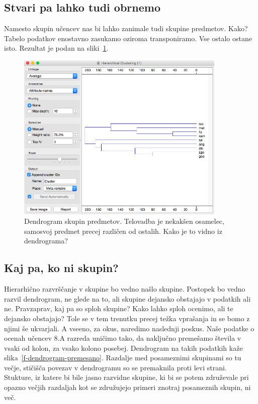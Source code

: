 \subsection{Stvari pa lahko tudi obrnemo}

Namesto skupin učencev nas bi lahko zanimale tudi skupine
predmetov. Kako? Tabelo podatkov enostavno zasukamo oziroma
transponiramo. Vse ostalo ostane isto. Rezultat je podan na
sliki~\ref{f-dendrogram-predmeti}.

\begin{figure}[htbp]
\begin{center}
\includegraphics[width=10cm]{slike/dendrogram-predmeti.png}
\caption{Dendrogram skupin predmetov. Telovadba je nekakšen osamelec,
  samosvoj predmet precej različen od ostalih. Kako je to vidno iz
  dendrograma?}
\label{f-dendrogram-predmeti}
\end{center}
\end{figure}

\subsection{Kaj pa, ko ni skupin?}

Hierarhično razvrščanje v skupine bo vedno našlo skupine. Postopek bo
vedno razvil dendrogram, ne glede na to, ali skupine dejansko
obstajajo v podatkih ali ne. Pravzaprav, kaj pa so sploh skupine? Kako
lahko sploh ocenimo, ali te dejansko obstajajo? Tole se v tem trenutku
precej težka vprašanja in se bomo z njimi še ukvarjali. A vseeno, za
okus, naredimo naslednji poskus. Naše podatke o ocenah učencev 8.A
razreda uničimo tako, da naključno premešamo števila v vsaki od kolon,
za vsako kolono posebej. Dendrogram na takih podatkih kaže
slika~\ref{f-dendrogram-premesano}. Razdalje med posameznimi skupinami
so tu večje, stičišča povezav v dendrogramu so se premaknila proti
levi strani. Stukture, iz katere bi bile jasno razvidne skupine, ki bi
se potem združevale pri opazno večjih razdaljah kot se združujejo
primeri znotraj posameznih skupin, ni več.

